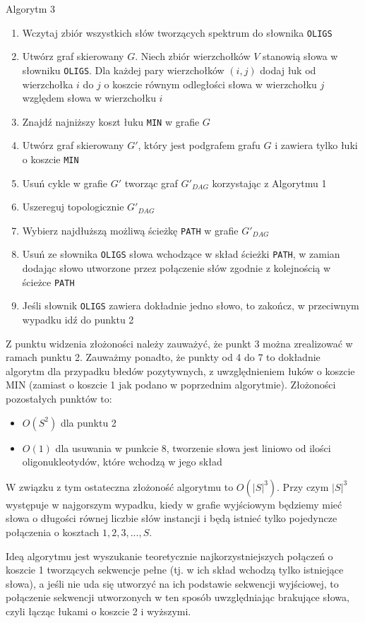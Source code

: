 \documentclass[a4paper,10pt]{article}
\begin{document}
Algorytm 3
\begin{enumerate}
 \item Wczytaj zbiór wszystkich słów tworzących spektrum do słownika \texttt{OLIGS}
 \item Utwórz graf skierowany $G$. Niech zbiór wierzchołków $V$ stanowią słowa w słowniku \texttt{OLIGS}. Dla każdej pary wierzchołków $(i,j)$ dodaj 
       łuk od wierzchołka $i$ do $j$ o koszcie równym odległości słowa w wierzchołku $j$ względem słowa w wierzchołku $i$
 \item Znajdź najniższy koszt łuku \texttt{MIN} w grafie $G$
 \item Utwórz graf skierowany $G'$, który jest podgrafem grafu $G$ i zawiera tylko łuki o koszcie \texttt{MIN}
 \item Usuń cykle w grafie $G'$ tworząc graf $G'_{DAG}$ korzystając z Algorytmu 1
 \item Uszereguj topologicznie $G'_{DAG}$
 \item Wybierz najdłuższą możliwą ścieżkę \texttt{PATH} w grafie $G'_{DAG}$
 \item Usuń ze słownika \texttt{OLIGS} słowa wchodzące w skład ścieżki \texttt{PATH}, w zamian dodając słowo utworzone przez połączenie słów zgodnie z kolejnością w ścieżce \texttt{PATH}
 \item Jeśli słownik \texttt{OLIGS} zawiera dokładnie jedno słowo, to zakończ, w przeciwnym wypadku idź do punktu 2
\end{enumerate}

Z punktu widzenia złożoności należy zauważyć, że punkt 3 można zrealizować w ramach punktu 2. Zauważmy ponadto, że punkty od 4 do 7 to dokładnie algorytm dla przypadku błedów pozytywnych, 
z uwzględnieniem łuków o koszcie MIN (zamiast o koszcie 1 jak podano w poprzednim algorytmie). Złożoności pozostałych punktów to:
\begin{itemize}
 \item $O(S^2)$ dla punktu 2
 \item $O(1)$ dla usuwania w punkcie 8, tworzenie słowa jest liniowo od ilości oligonukleotydów, które wchodzą w jego skład
\end{itemize}
W związku z tym ostateczna złożoność algorytmu to $O(|S|^3)$. Przy czym $|S|^3$ występuje w najgorszym wypadku, 
kiedy w grafie wyjściowym będziemy mieć słowa o długości równej liczbie słów instancji i będą istnieć tylko pojedyncze połączenia o kosztach $1, 2, 3, ..., S$.

Ideą algorytmu jest wyszukanie teoretycznie najkorzystniejszych połączeń o koszcie 1 tworzących sekwencje 
pełne (tj. w ich skład wchodzą tylko istniejące słowa), a jeśli nie uda się utworzyć na ich podstawie sekwencji wyjściowej, 
to połączenie sekwencji utworzonych w ten sposób uwzględniając brakujące słowa, czyli łącząc łukami o koszcie 2 i wyższymi. 
\end{document}
